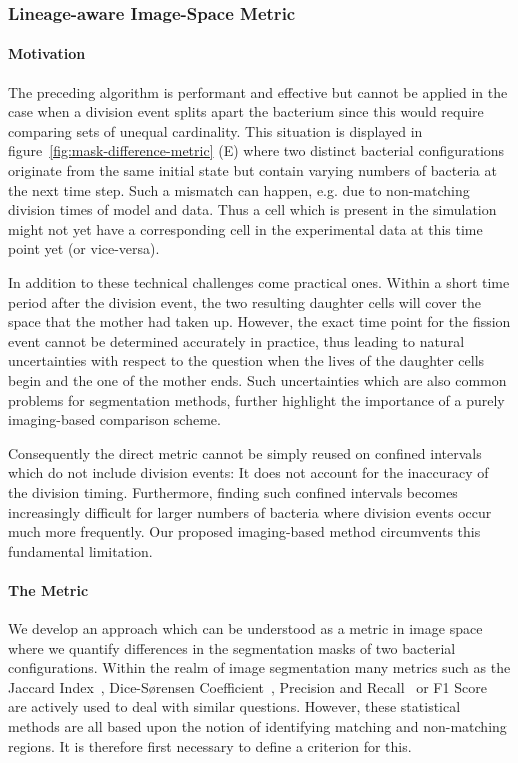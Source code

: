 \subsubsection{Lineage-aware Image-Space Metric}
\label{subsec:image-space-metric}
\paragraph{Motivation}
The preceding algorithm is performant and effective but cannot be applied in the case when a
division event splits apart the bacterium since this would require comparing sets of unequal
cardinality.
This situation is displayed in figure~\ref{fig:mask-difference-metric} (E) where two distinct
bacterial configurations originate from the same initial state but contain varying numbers of
bacteria at the next time step.
Such a mismatch can happen, e.g. due to non-matching division times of model and data.
Thus a cell which is present in the simulation might not yet have a corresponding cell in the
experimental data at this time point yet (or vice-versa).

In addition to these technical challenges come practical ones.
Within a short time period after the division event, the two resulting daughter cells will cover
the space that the mother had taken up.
However, the exact time point for the fission event cannot be determined accurately in practice,
thus leading to natural uncertainties with respect to the question when the lives of
the daughter
cells begin and the one of the mother ends.
Such uncertainties which are also common problems for segmentation methods, further
highlight the
importance of a purely imaging-based comparison scheme.

Consequently the direct metric cannot be simply reused on confined intervals which
do not include division events:
It does not account for the inaccuracy of the division timing.
Furthermore, finding such confined intervals becomes increasingly difficult for
larger numbers of
bacteria where division events occur much more frequently.
Our proposed imaging-based method circumvents this fundamental limitation.

\paragraph{The Metric}
We develop an approach which can be understood as a metric in image space where we quantify
differences in the segmentation masks of two bacterial configurations.
Within the realm of image segmentation many metrics such as the Jaccard Index~\cite{Murphy1996},
Dice-Sørensen Coefficient~\cite{Dice1945}, Precision and Recall~\cite{Takaya2015} or F1
Score~\cite{Taha2015} are actively used to deal with similar questions.
However, these statistical methods are all based upon the notion of identifying matching and
non-matching regions.
It is therefore first necessary to define a criterion for this.

